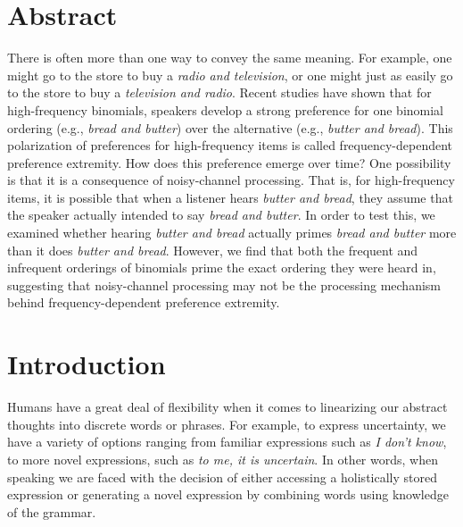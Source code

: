 \documentclass[
  12pt,
]{scrartcl}
\renewcommand*\contentsname{Table of contents}
\newcommand\contentsname{Table of contents}
\begin{document}
\setcounter{page}{\value{savedpage}} %
\clearpage

\renewcommand*\contentsname{Table of contents}
{
\setcounter{tocdepth}{3}
\tableofcontents
}

\newpage

\doublespacing

\setlength{\parindent}{4em}

\section*{Abstract}\label{sec-abstract}

There is often more than one way to convey the same meaning. For
example, one might go to the store to buy a \emph{radio and television},
or one might just as easily go to the store to buy a \emph{television
and radio}. Recent studies have shown that for high-frequency binomials,
speakers develop a strong preference for one binomial ordering (e.g.,
\emph{bread and butter}) over the alternative (e.g., \emph{butter and
bread}). This polarization of preferences for high-frequency items is
called frequency-dependent preference extremity. How does this
preference emerge over time? One possibility is that it is a consequence
of noisy-channel processing. That is, for high-frequency items, it is
possible that when a listener hears \emph{butter and bread}, they assume
that the speaker actually intended to say \emph{bread and butter}. In
order to test this, we examined whether hearing \emph{butter and bread}
actually primes \emph{bread and butter} more than it does \emph{butter
and bread}. However, we find that both the frequent and infrequent
orderings of binomials prime the exact ordering they were heard in,
suggesting that noisy-channel processing may not be the processing
mechanism behind frequency-dependent preference extremity.

\newpage


\section{Introduction}\label{introduction}

Humans have a great deal of flexibility when it comes to linearizing our
abstract thoughts into discrete words or phrases. For example, to
express uncertainty, we have a variety of options ranging from familiar
expressions such as \emph{I don't know}, to more novel expressions, such
as \emph{to me, it is uncertain}. In other words, when speaking we are
faced with the decision of either accessing a holistically stored
expression or generating a novel expression by combining words using
knowledge of the grammar.
\end{document}
